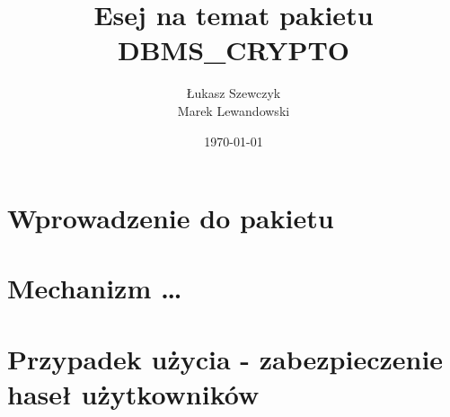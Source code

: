 \documentclass[12pt, a4paper]{article}
\begin{document}
\title{Esej na temat pakietu DBMS\_CRYPTO}
\author{Łukasz Szewczyk\\
		Marek Lewandowski }
\date{\today}



\maketitle


\section{Wprowadzenie do pakietu}

\section{Mechanizm \ldots}

\section{Przypadek użycia - zabezpieczenie haseł użytkowników}
  
\end{document}
